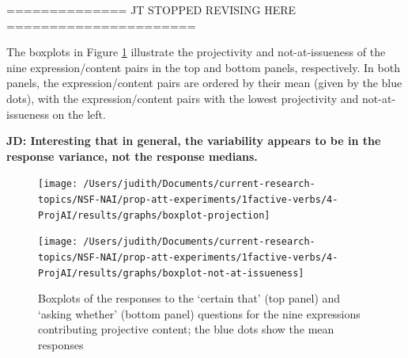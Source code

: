 \documentclass[11pt,fleqn]{article}
\newcommand{\6}{\mbox{$[\hspace*{-.6mm}[$}}
\newcommand{\9}{\mbox{$]\hspace*{-.6mm}]$}}
\begin{document}
\newpage

============== JT STOPPED REVISING HERE ======================


The boxplots in Figure \ref{f-exp1a} illustrate the projectivity and not-at-issueness of the nine expression/content pairs in the top and bottom panels, respectively. In both panels, the expression/content pairs are ordered by their mean (given by the blue dots), with the expression/content pairs with the lowest projectivity and not-at-issueness on the left. 

{\bf JD: Interesting that in general, the variability appears to be in the response variance, not the response medians.}

\begin{figure}[!h]

\begin{center}
\texttt{[image: /Users/judith/Documents/current-research-topics/NSF-NAI/prop-att-experiments/1factive-verbs/4-ProjAI/results/graphs/boxplot-projection]}

\texttt{[image: /Users/judith/Documents/current-research-topics/NSF-NAI/prop-att-experiments/1factive-verbs/4-ProjAI/results/graphs/boxplot-not-at-issueness]}
\end{center}

\caption{Boxplots of the responses to the `certain that' (top panel) and `asking whether' (bottom panel) questions for the nine expressions contributing projective content; the blue dots show the mean responses}\label{f-exp1a}
\end{figure}
\end{document}
